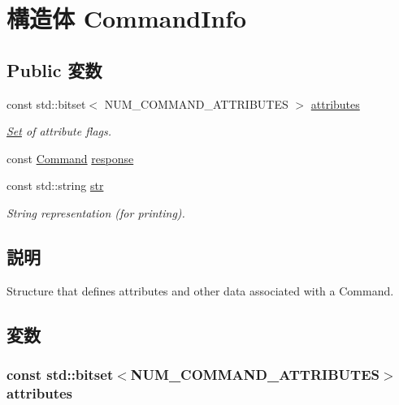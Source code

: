 \hypertarget{structMemCmd_1_1CommandInfo}{
\section{構造体 CommandInfo}
\label{structMemCmd_1_1CommandInfo}
}
\subsection*{Public 変数}
\begin{DoxyCompactItemize}
\item 
const std::bitset$<$ NUM\_\-COMMAND\_\-ATTRIBUTES $>$ \hyperlink{structMemCmd_1_1CommandInfo_af901f6d4a4075126b3ca3e4375750afb}{attributes}
\begin{DoxyCompactList}\small\item\em \hyperlink{classSet}{Set} of attribute flags. \item\end{DoxyCompactList}\item 
const \hyperlink{classMemCmd_a2afce0a47a93eee73a314d53e4890153}{Command} \hyperlink{structMemCmd_1_1CommandInfo_a1c57b679ee250b3cfb3763a8c68a41d2}{response}
\item 
const std::string \hyperlink{structMemCmd_1_1CommandInfo_a2a98c1fe01d4f15bb6333773fbbe879c}{str}
\begin{DoxyCompactList}\small\item\em String representation (for printing). \item\end{DoxyCompactList}\end{DoxyCompactItemize}


\subsection{説明}
Structure that defines attributes and other data associated with a Command. 

\subsection{変数}
\hypertarget{structMemCmd_1_1CommandInfo_af901f6d4a4075126b3ca3e4375750afb}{
\subsubsection[{attributes}]{\setlength{\rightskip}{0pt plus 5cm}const std::bitset$<$NUM\_\-COMMAND\_\-ATTRIBUTES$>$ {\bf attributes}}}
\label{structMemCmd_1_1CommandInfo_af901f6d4a4075126b3ca3e4375750afb}


